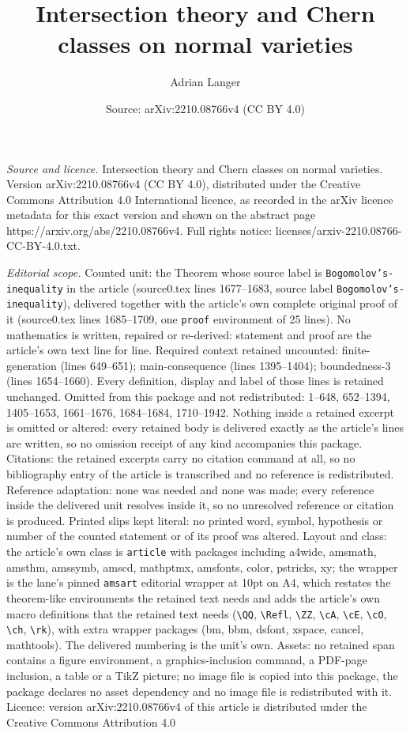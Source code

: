 \documentclass[10pt,a4paper]{amsart}
\title[Intersection theory and Chern classes on normal varieties]{Intersection theory and Chern classes on normal varieties}
\author{Adrian Langer}
\date{Source: arXiv:2210.08766v4 (CC BY 4.0)}
\begin{document}
\maketitle

\noindent\emph{Source and licence.} Intersection theory and Chern classes on normal varieties. Version arXiv:2210.08766v4 (CC BY 4.0), distributed under the Creative Commons Attribution 4.0 International licence, as recorded in the arXiv licence metadata for this exact version and shown on the abstract page https://arxiv.org/abs/2210.08766v4. Full rights notice: licenses/arxiv-2210.08766-CC-BY-4.0.txt.\par\smallskip

\noindent\textit{Editorial scope.} Counted unit: the Theorem whose source label is \texttt{Bogomolov's-inequality} in the article (source0.tex lines 1677--1683, source label \texttt{Bogomolov's-inequality}), delivered together with the article's own complete original proof of it (source0.tex lines 1685--1709, one \texttt{proof} environment of 25 lines). No mathematics is written, repaired or re-derived: statement and proof are the article's own text line for line. Required context retained uncounted: finite-generation (lines 649--651); main-consequence (lines 1395--1404); boundedness-3 (lines 1654--1660). Every definition, display and label of those lines is retained unchanged. Omitted from this package and not redistributed: 1--648, 652--1394, 1405--1653, 1661--1676, 1684--1684, 1710--1942. Nothing inside a retained excerpt is omitted or altered: every retained body is delivered exactly as the article's lines are written, so no omission receipt of any kind accompanies this package. Citations: the retained excerpts carry no citation command at all, so no bibliography entry of the article is transcribed and no reference is redistributed. Reference adaptation: none was needed and none was made; every reference inside the delivered unit resolves inside it, so no unresolved reference or citation is produced. Printed slips kept literal: no printed word, symbol, hypothesis or number of the counted statement or of its proof was altered. Layout and class: the article's own class is \texttt{article} with packages including a4wide, amsmath, amsthm, amssymb, amscd, mathptmx, amsfonts, color, pstricks, xy; the wrapper is the lane's pinned \texttt{amsart} editorial wrapper at 10pt on A4, which restates the theorem-like environments the retained text needs and adds the article's own macro definitions that the retained text needs (\texttt{\textbackslash QQ}, \texttt{\textbackslash Refl}, \texttt{\textbackslash ZZ}, \texttt{\textbackslash cA}, \texttt{\textbackslash cE}, \texttt{\textbackslash cO}, \texttt{\textbackslash ch}, \texttt{\textbackslash rk}), with extra wrapper packages (bm, bbm, dsfont, xspace, cancel, mathtools). The delivered numbering is the unit's own. Assets: no retained span contains a figure environment, a graphics-inclusion command, a PDF-page inclusion, a table or a TikZ picture; no image file is copied into this package, the package declares no asset dependency and no image file is redistributed with it. Licence: version arXiv:2210.08766v4 of this article is distributed under the Creative Commons Attribution 4.0 
\end{document}
